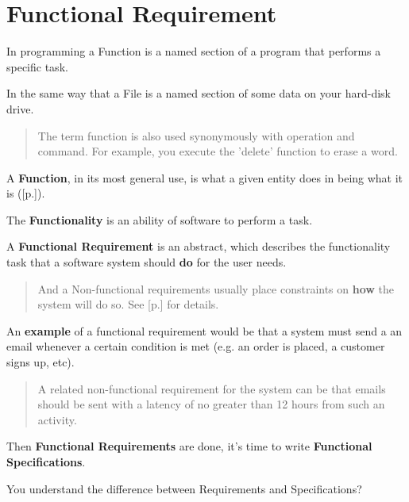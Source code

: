 \section{Functional Requirement}
\label{sec:Functional Requirement}

In programming a Function is a named section of a program that performs a specific task.

In the same way that a File is a named section of some data on your hard-disk drive.

\begin{quote}
The term function is also used synonymously with operation and command. For example, you execute the 'delete' function to erase a word.                                                                                                                                       \end{quote} 

A \textbf{Function}, in its most general use, is what a given entity does in being what it is ([p.\pageref{sec:Function}]).

The \textbf{Functionality} is an ability of software to perform a task.

A \textbf{Functional Requirement} is an abstract, which describes the functionality task that a software system should \textbf{do} for the user needs.

\begin{quote}
And a Non-functional requirements usually place constraints on \textbf{how} the system will do so. See [p.\pageref{sec:Non-functional Requirement}] for details.                                                                                        \end{quote} 

An \textbf{example} of a functional requirement would be that a system must send a an email whenever a certain condition is met (e.g. an order is placed, a customer signs up, etc).

\begin{quote}
A related non-functional requirement for the system can be that emails should be sent with a latency of no greater than 12 hours from such an activity.
\end{quote} 

Then \textbf{Functional Requirements} are done, it's time to write \textbf{Functional Specifications}.

You understand the difference between Requirements and Specifications?